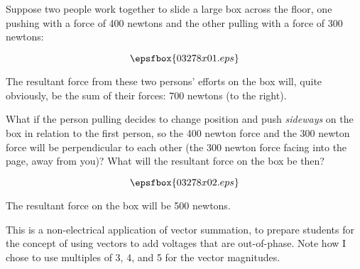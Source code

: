 

Suppose two people work together to slide a large box across the floor, one pushing with a force of 400 newtons and the other pulling with a force of 300 newtons:

$$\epsfbox{03278x01.eps}$$

The resultant force from these two persons' efforts on the box will, quite obviously, be the sum of their forces: 700 newtons (to the right).

\vskip 10pt

What if the person pulling decides to change position and push {\it sideways} on the box in relation to the first person, so the 400 newton force and the 300 newton force will be perpendicular to each other (the 300 newton force facing into the page, away from you)?  What will the resultant force on the box be then?

$$\epsfbox{03278x02.eps}$$







The resultant force on the box will be 500 newtons.







This is a non-electrical application of vector summation, to prepare students for the concept of using vectors to add voltages that are out-of-phase.  Note how I chose to use multiples of 3, 4, and 5 for the vector magnitudes.




